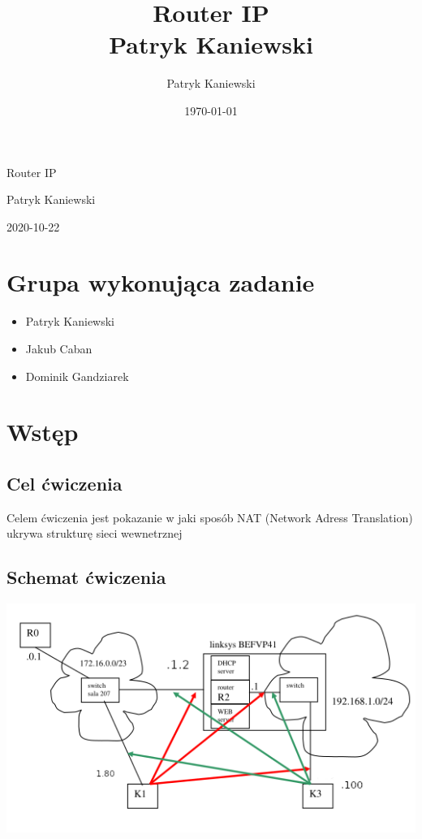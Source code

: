 \documentclass[11pt]{article}
\author{Patryk Kaniewski}
\date{\today}
\title{Router IP \\
Patryk Kaniewski}
\begin{document}
\begin{titlepage}
\begin{center}
{\Huge Router IP \par}
\vspace{2cm}
{\Large Patryk Kaniewski \par
}\vspace{2cm}
{\large 2020-10-22}
\end{center}
\end{titlepage}
\setcounter{tocdepth}{2}
\tableofcontents \clearpage

\section{Grupa wykonująca zadanie}
\label{sec:org8edc83e}
\begin{itemize}
\item Patryk Kaniewski
\item Jakub Caban
\item Dominik Gandziarek
\end{itemize}

\section{Wstęp}
\label{sec:org568ddb8}
\subsection{Cel ćwiczenia}
\label{sec:org3b9c606}
Celem ćwiczenia jest pokazanie w jaki sposób NAT (Network Adress Translation) ukrywa strukturę sieci wewnetrznej
\subsection{Schemat ćwiczenia}
\label{sec:org16e6f6f}
\begin{center}
\includegraphics[width=.9\linewidth]{./schemat.png}
\end{center}
\end{document}
